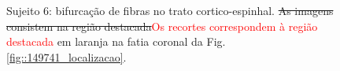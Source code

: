 \begin{figure}[H]
\centering
    \hfill
    \caption{Sujeito 6: bifurcação de fibras no trato cortico-espinhal. \sout{As imagens consistem na região destacada}\textcolor{red}{Os recortes correspondem à região destacada} em laranja na fatia coronal da Fig. \ref{fig::149741_localizacao}.
    }
    \label{fig::149741_fanning}
\end{figure}

